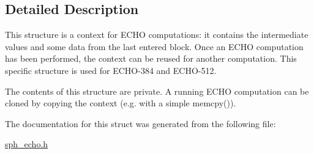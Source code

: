 \subsection{Detailed Description}
This structure is a context for E\+C\+HO computations\+: it contains the intermediate values and some data from the last entered block. Once an E\+C\+HO computation has been performed, the context can be reused for another computation. This specific structure is used for E\+C\+H\+O-\/384 and E\+C\+H\+O-\/512.

The contents of this structure are private. A running E\+C\+HO computation can be cloned by copying the context (e.\+g. with a simple {\ttfamily memcpy()}). 

The documentation for this struct was generated from the following file\+:\begin{DoxyCompactItemize}
\item 
\mbox{\hyperlink{sph__echo_8h}{sph\+\_\+echo.\+h}}\end{DoxyCompactItemize}
